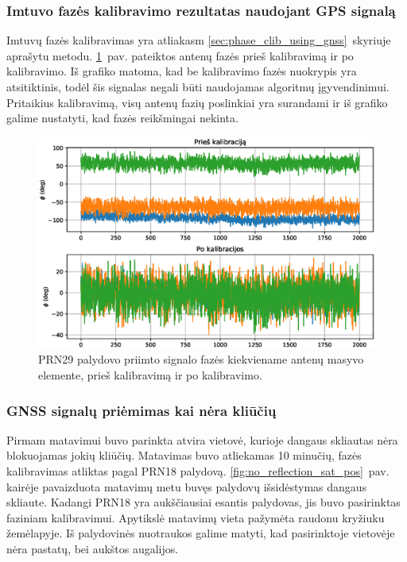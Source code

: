 \documentclass[main.tex]{subfiles}
\begin{document}
\subsubsection{Imtuvo fazės kalibravimo rezultatas naudojant GPS signalą}

Imtuvų fazės kalibravimas yra atliakasm \ref{sec:phase_clib_using_gnss}~skyriuje
aprašytu metodu. \ref{fig:gnss_phase_calibration}~pav. pateiktos
antenų fazės prieš kalibravimą ir po kalibravimo. Iš grafiko matoma,
kad be kalibravimo fazės nuokrypis yra atsitiktinis, todėl šis signalas
negali būti naudojamas algoritmų įgyvendinimui. Pritaikius kalibravimą,
visų antenų fazių poslinkiai yra surandami ir iš grafiko galime nustatyti,
kad fazės reikšmingai nekinta.

\begin{figure}[ht]
    \begin{centering}
    \includegraphics[scale=0.65]{drawings/phase_calibration}
    \par\end{centering}
    \protect\caption{\label{fig:gnss_phase_calibration}PRN29 palydovo priimto signalo fazės kiekviename antenų masyvo elemente, prieš kalibravimą ir po kalibravimo.}
\end{figure}

\subsubsection{GNSS signalų priėmimas kai nėra kliūčių}\label{sec:gnss_meas_no_reflection}

Pirmam matavimui buvo parinkta atvira vietovė, kurioje dangaus skliautas nėra blokuojamas
jokių kliūčių. Matavimas buvo atliekamas 10 minučių, fazės kalibravimas atliktas pagal PRN18 palydovą.
\ref{fig:no_reflection_sat_pos}~pav. kairėje pavaizduota matavimų metu buvęs palydovų išsidėstymas
dangaus skliaute. Kadangi PRN18 yra aukščiausiai esantis palydovas, jis buvo pasirinktas
faziniam kalibravimui. Apytikslė matavimų vieta pažymėta raudonu kryžiuku žemėlapyje.
Iš palydovinės nuotraukos galime matyti, kad pasirinktoje vietovėje nėra pastatų,
bei aukštos augalijos.
\end{document}
